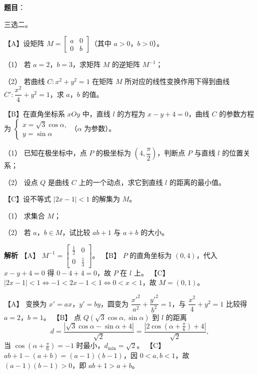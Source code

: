 \begin{answer}

\textbf{题目}：

三选二。

【A】设矩阵 $M=\begin{bmatrix}a&0\\0&b\end{bmatrix}$（其中 $a>0$，$b>0$）。

（1） 若 $a=2$，$b=3$，求矩阵 $M$ 的逆矩阵 $M^{-1}$；

（2） 若曲线 $C:x^2+y^2=1$ 在矩阵 $M$ 所对应的线性变换作用下得到曲线 $C':\dfrac{x^2}4+y^2=1$，求 $a$，$b$ 的值。

【B】在直角坐标系 $xOy$ 中，直线 $l$ 的方程为 $x-y+4=0$，曲线 $C$ 的参数方程为 $\begin{cases}x=\sqrt3\cos\alpha,\\y=\sin\alpha\end{cases}$（$\alpha$ 为参数）。

（1） 已知在极坐标中，点 $P$ 的极坐标为 $\left(4,\dfrac\pi2\right)$，判断点 $P$ 与直线 $l$ 的位置关系；

（2） 设点 $Q$ 是曲线 $C$ 上的一个动点，求它到直线 $l$ 的距离的最小值。

【C】设不等式 $|2x-1|<1$ 的解集为 $M$。

（1） 求集合 $M$；

（2） 若 $a$，$b\in M$，试比较 $ab+1$ 与 $a+b$ 的大小。

\textbf{解析}
【A】 $M^{-1}=\begin{bmatrix}\frac12&0\\0&\frac13\end{bmatrix}$。
【B】 $P$ 的直角坐标为 $(0,4)$，代入 $x-y+4=0$ 得 $0-4+4=0$，故 $P$ 在 $l$ 上。
【C】 $|2x-1|<1\iff-1<2x-1<1\iff0<x<1$，故 $M=(0,1)$。

【A】 变换为 $x'=ax$，$y'=by$，圆变为 $\dfrac{x'^2}{a^2}+\dfrac{y'^2}{b^2}=1$，与 $\dfrac{x^2}4+y^2=1$ 比较得 $a=2$，$b=1$。
【B】 点 $Q(\sqrt3\cos\alpha,\sin\alpha)$ 到 $l$ 的距离
\nopagebreak[4]
\[d=\frac{|\sqrt3\cos\alpha-\sin\alpha+4|}{\sqrt2}
=\frac{|2\cos(\alpha+\frac\pi6)+4|}{\sqrt2},\]
当 $\cos(\alpha+\frac\pi6)=-1$ 时最小，$d_{\min}=\sqrt2$。
【C】 $ab+1-(a+b)=(a-1)(b-1)$，因 $0<a,b<1$，故 $(a-1)(b-1)>0$，即 $ab+1>a+b$。



\end{answer}